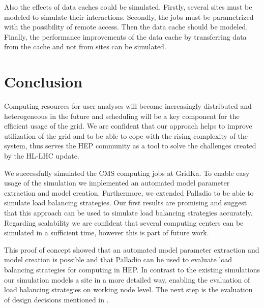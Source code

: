 \documentclass{webofc}
\begin{document}
Also the effects of data caches could be simulated. Firstly, several sites must be modeled to simulate their interactions. Secondly, the jobs must be parametrized with the possibility of remote access. Then the data cache should be modeled. Finally, the performance improvements of the data cache by transferring data from the cache and not from sites can be simulated.
\section{Conclusion}
\label{conlusion}

Computing resources for user analyses will become increasingly distributed and heterogeneous in the future and 
scheduling will be a key component for the efficient usage of the grid. We are confident that our approach helps to improve utilization of the grid and to be able to cope with the rising complexity of the system, thus serves the HEP community as a tool to solve the challenges created by the HL-LHC update.

We successfully simulated the CMS computing jobs at GridKa. To enable easy usage of the simulation we implemented an automated model parameter extraction and model creation. Furthermore, we extended Palladio to be able to simulate load balancing strategies. Our first results are promising and suggest that this approach can be used to simulate load balancing strategies accurately. Regarding scalability we are confident that several computing centers can be simulated in a sufficient time, however this is part of future work.

This proof of concept showed that an automated model parameter extraction and model creation is possible and that Palladio can be used to evaluate load balancing strategies for computing in HEP. In contrast to the existing simulations our simulation models a site in a more detailed way, enabling the evaluation of load balancing strategies on working node level. The next step is the evaluation of design decisions mentioned in .


\end{document}

